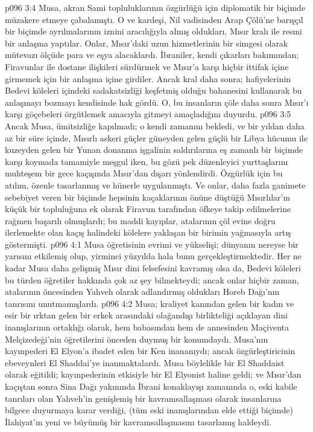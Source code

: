 \vs p096 3:4 Musa, akran Sami topluluklarının özgürlüğü için diplomatik bir biçimde müzakere etmeye çabalamıştı. O ve kardeşi, Nil vadisinden Arap Çölü’ne barışçıl bir biçimde ayrılmalarının iznini aracılığıyla almış oldukları, Mısır kralı ile resmi bir anlaşma yaptılar. Onlar, Mısır’daki uzun hizmetlerinin bir simgesi olarak mütevazı ölçüde para ve eşya alacaklardı. İbraniler, kendi çıkarları bakımından; Firavunlar ile dostane ilişkileri sürdürmek ve Mısır’a karşı hiçbir ittifak içine girmemek için bir anlaşma içine girdiler. Ancak kral daha sonra; hafiyelerinin Bedevi köleleri içindeki sadakatsizliği keşfetmiş olduğu bahanesini kullanarak bu anlaşmayı bozmayı kendisinde hak gördü. O, bu insanların çöle daha sonra Mısır’ı karşı göçebeleri örgütlemek amacıyla gitmeyi amaçladığını duyurdu.
\vs p096 3:5 Ancak Musa, ümitsizliğe kapılmadı; o kendi zamanını bekledi, ve bir yıldan daha az bir süre içinde, Mısırlı askeri güçler güneyden gelen güçlü bir Libya hücumu ile kuzeyden gelen bir Yunan donanma işgalinin saldırılarına eş zamanlı bir biçimde karşı koymada tamamiyle meşgul iken, bu gözü pek düzenleyici yurttaşlarını muhteşem bir gece kaçışında Mısır’dan dışarı yönlendirdi. Özgürlük için bu atılım, özenle tasarlanmış ve hünerle uygulanmıştı. Ve onlar, daha fazla ganimete sebebiyet veren bir biçimde hepsinin kaçaklarının önüne düştüğü Mısırlılar’ın küçük bir topluluğuna ek olarak Firavun tarafından öfkeye takip edilmelerine rağmen başarılı olmuşlardı; bu maddi kayıplar, atalarının çöl evine doğru ilerlemekte olan kaçış halindeki kölelere yaklaşan bir birimin yağmasıyla artış göstermişti.
\vs p096 4:1 Musa öğretisinin evrimi ve yükselişi; dünyanın nereyse bir yarısını etkilemiş olup, yirminci yüzyılda hala bunu gerçekleştirmektedir. Her ne kadar Musa daha gelişmiş Mısır dini felsefesini kavramış olsa da, Bedevi köleleri bu türden öğretiler hakkında çok az şey bilmekteydi; ancak onlar hiçbir zaman, atalarının öncesinden Yahveh olarak adlandırmış oldukları Horeb Dağı’nın tanrısını unutmamışlardı.
\vs p096 4:2 Musa; kraliyet kanından gelen bir kadın ve esir bir ırktan gelen bir erkek arasındaki olağandışı birlikteliği açıklayan dini inanışlarının ortaklığı olarak, hem babasından hem de annesinden Maçiventa Melçizedeği’nin öğretilerini önceden duymuş bir konumdaydı. Musa’nın kayınpederi El Elyon’a ibadet eden bir Ken inananıydı; ancak özgürleştiricinin ebeveynleri El Shaddai’ye inanmaktalardı. Musa böylelikle bir El Shaddaist olarak eğitildi; kayınpederinin etkisiyle bir El Elyonist haline geldi; ve Mısır’dan kaçıştan sonra Sina Dağı yakınında İbrani konaklayışı zamanında o, eski kabile tanrıları olan Yahveh’in genişlemiş bir kavramsallaşması olarak insanlarına bilgece duyurmaya karar verdiği, (tüm eski inanışlarından elde ettiği biçimde) İlahiyat’ın yeni ve büyümüş bir kavramsallaşmasını tasarlamış haldeydi.

